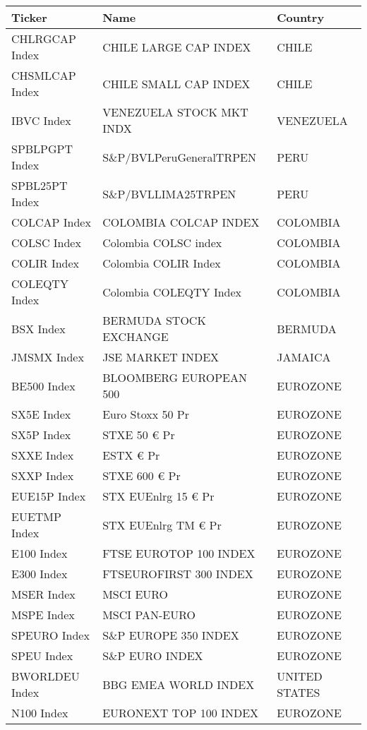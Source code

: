 \begin {table}[H]
\begin{center}
\small
\hspace*{-3cm}
\begin{tabu}{| l l l |} 
\hline
Ticker & Name & Country\\
\hline
CHLRGCAP Index & CHILE LARGE CAP INDEX & CHILE \\ 
CHSMLCAP Index & CHILE SMALL CAP INDEX & CHILE \\ 
IBVC Index & VENEZUELA STOCK MKT INDX & VENEZUELA \\ 
SPBLPGPT Index & S\&P/BVLPeruGeneralTRPEN & PERU \\ 
SPBL25PT Index & S\&P/BVLLIMA25TRPEN & PERU \\ 
COLCAP Index & COLOMBIA COLCAP INDEX & COLOMBIA \\ 
COLSC Index & Colombia COLSC index & COLOMBIA \\ 
COLIR Index & Colombia COLIR Index & COLOMBIA \\ 
COLEQTY Index & Colombia COLEQTY  Index & COLOMBIA \\ 
BSX Index & BERMUDA STOCK EXCHANGE & BERMUDA \\ 
JMSMX Index & JSE MARKET INDEX & JAMAICA \\ 
BE500 Index & BLOOMBERG EUROPEAN 500 & EUROZONE \\ 
SX5E Index & Euro Stoxx 50 Pr & EUROZONE \\ 
SX5P Index & STXE 50 € Pr & EUROZONE \\ 
SXXE Index & ESTX € Pr & EUROZONE \\ 
SXXP Index & STXE 600 € Pr & EUROZONE \\ 
EUE15P Index & STX EUEnlrg 15 € Pr & EUROZONE \\ 
EUETMP Index & STX EUEnlrg TM € Pr & EUROZONE \\ 
E100 Index & FTSE EUROTOP 100 INDEX & EUROZONE \\ 
E300 Index & FTSEUROFIRST 300 INDEX & EUROZONE \\ 
MSER Index & MSCI EURO & EUROZONE \\ 
MSPE Index & MSCI PAN-EURO & EUROZONE \\ 
SPEURO Index & S\&P EUROPE 350 INDEX & EUROZONE \\ 
SPEU Index & S\&P EURO INDEX & EUROZONE \\ 
BWORLDEU Index & BBG EMEA WORLD INDEX & UNITED STATES \\ 
N100 Index & EURONEXT TOP 100 INDEX & EUROZONE \\ 

\end{tabu}
\end{center}
\end{table}
